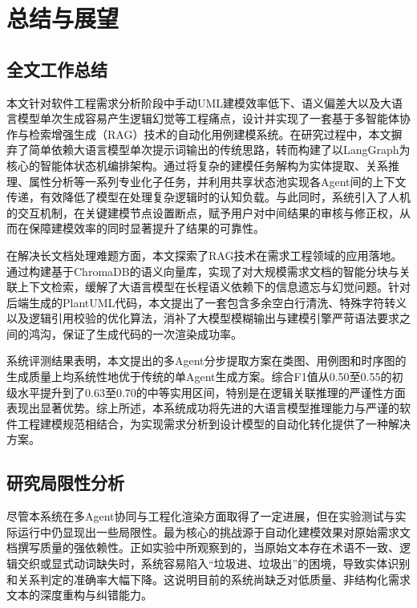 \chapter{总结与展望}
\vspace{7pt}

\section{全文工作总结}

本文针对软件工程需求分析阶段中手动UML建模效率低下、语义偏差大以及大语言模型单次生成容易产生逻辑幻觉等工程痛点，设计并实现了一套基于多智能体协作与检索增强生成（RAG）技术的自动化用例建模系统。在研究过程中，本文摒弃了简单依赖大语言模型单次提示词输出的传统思路，转而构建了以LangGraph为核心的智能体状态机编排架构。通过将复杂的建模任务解构为实体提取、关系推理、属性分析等一系列专业化子任务，并利用共享状态池实现各Agent间的上下文传递，有效降低了模型在处理复杂逻辑时的认知负载。与此同时，系统引入了人机的交互机制，在关键建模节点设置断点，赋予用户对中间结果的审核与修正权，从而在保障建模效率的同时显著提升了结果的可靠性。

在解决长文档处理难题方面，本文探索了RAG技术在需求工程领域的应用落地。通过构建基于ChromaDB的语义向量库，实现了对大规模需求文档的智能分块与关联上下文检索，缓解了大语言模型在长程语义依赖下的信息遗忘与幻觉问题。针对后端生成的PlantUML代码，本文提出了一套包含多余空白行清洗、特殊字符转义以及逻辑引用校验的优化算法，消补了大模型模糊输出与建模引擎严苛语法要求之间的鸿沟，保证了生成代码的一次渲染成功率。

系统评测结果表明，本文提出的多Agent分步提取方案在类图、用例图和时序图的生成质量上均系统性地优于传统的单Agent生成方案。综合F1值从0.50至0.55的初级水平提升到了0.63至0.70的中等实用区间，特别是在逻辑关联推理的严谨性方面表现出显著优势。综上所述，本系统成功将先进的大语言模型推理能力与严谨的软件工程建模规范相结合，为实现需求分析到设计模型的自动化转化提供了一种解决方案。

\section{研究局限性分析}

尽管本系统在多Agent协同与工程化渲染方面取得了一定进展，但在实验测试与实际运行中仍显现出一些局限性。最为核心的挑战源于自动化建模效果对原始需求文档撰写质量的强依赖性。正如实验中所观察到的，当原始文本存在术语不一致、逻辑交织或显式动词缺失时，系统容易陷入“垃圾进、垃圾出”的困境，导致实体识别和关系判定的准确率大幅下降。这说明目前的系统尚缺乏对低质量、非结构化需求文本的深度重构与纠错能力。


